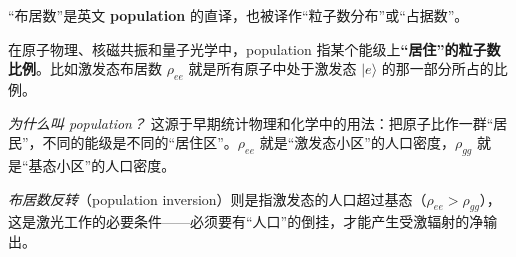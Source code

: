\begin{tipbox}
``布居数''是英文 \textbf{population} 的直译，也被译作``粒子数分布''或``占据数''。

在原子物理、核磁共振和量子光学中，population 指某个能级上\textbf{``居住''的粒子数比例}。比如激发态布居数 $\rho_{ee}$ 就是所有原子中处于激发态 $|e\rangle$ 的那一部分所占的比例。

\textit{为什么叫 population？} 这源于早期统计物理和化学中的用法：把原子比作一群``居民''，不同的能级是不同的``居住区''。$\rho_{ee}$ 就是``激发态小区''的人口密度，$\rho_{gg}$ 就是``基态小区''的人口密度。

\textit{布居数反转}（population inversion）则是指激发态的人口超过基态（$\rho_{ee} > \rho_{gg}$），这是激光工作的必要条件——必须要有``人口''的倒挂，才能产生受激辐射的净输出。
\end{tipbox}

